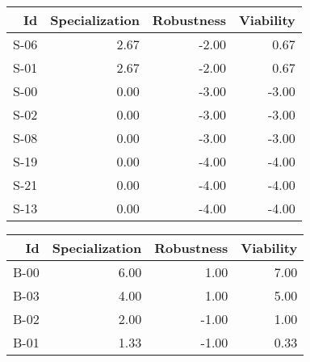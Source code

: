 


\begin{tabular}{ | r | r | r | r | }
    \hline
                    Id  &  Specialization  &      Robustness  &       Viability  \\
    \hline
    \hline
                  S-06  &            2.67  &           -2.00  &            0.67  \\
    \hline
                  S-01  &            2.67  &           -2.00  &            0.67  \\
    \hline
                  S-00  &            0.00  &           -3.00  &           -3.00  \\
    \hline
                  S-02  &            0.00  &           -3.00  &           -3.00  \\
    \hline
                  S-08  &            0.00  &           -3.00  &           -3.00  \\
    \hline
                  S-19  &            0.00  &           -4.00  &           -4.00  \\
    \hline
                  S-21  &            0.00  &           -4.00  &           -4.00  \\
    \hline
                  S-13  &            0.00  &           -4.00  &           -4.00  \\
    \hline
\end{tabular}


\begin{tabular}{ | r | r | r | r | }
    \hline
                    Id  &  Specialization  &      Robustness  &       Viability  \\
    \hline
    \hline
                  B-00  &            6.00  &            1.00  &            7.00  \\
    \hline
                  B-03  &            4.00  &            1.00  &            5.00  \\
    \hline
                  B-02  &            2.00  &           -1.00  &            1.00  \\
    \hline
                  B-01  &            1.33  &           -1.00  &            0.33  \\
    \hline
\end{tabular}


